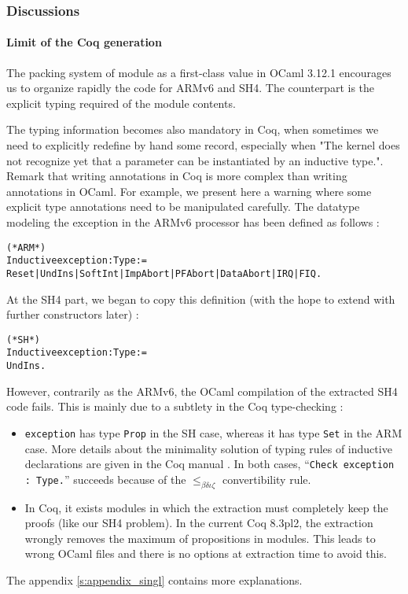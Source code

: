 \documentclass[a4paper, 11pt]{article}
\newenvironment{coq}
  {%
   \begin{alltt}
   \footnotesize} %% 8.3pl2 (April 2011)
  {\end{alltt} %
  }
\newcommand{\ocaml}{OCaml 3.12.1\xspace}
\newcommand{\coqc}{Coq 8.3pl2\xspace}
\newcommand{\coqkernel}{"The kernel does not recognize yet that a parameter can be instantiated by an inductive type."}
\begin{document}
\subsubsection{Discussions}

\paragraph{Limit of the Coq generation}
The packing system of module as a first-class value in \ocaml encourages us to organize rapidly the code for ARMv6 and SH4. The counterpart is the explicit typing required of the module contents. 

The typing information becomes also mandatory in Coq, when sometimes we need to explicitly redefine by hand some record, especially when \coqkernel. Remark that writing annotations in Coq is more complex than writing annotations in OCaml. For example, we present here a warning where some explicit type annotations need to be manipulated carefully. The datatype modeling the exception in the ARMv6 processor has been defined as follows :
\begin{coq}
(* ARM *)
Inductive exception : Type :=
  Reset | UndIns | SoftInt | ImpAbort | PFAbort | DataAbort | IRQ | FIQ.
\end{coq}
At the SH4 part, we began to copy this definition (with the hope to extend with further constructors later) :
\begin{coq}
(* SH *)
Inductive exception : Type :=
  UndIns.
\end{coq}
However, contrarily as the ARMv6, the OCaml compilation of the extracted SH4 code fails. This is mainly due to a subtlety in the Coq type-checking :
\begin{itemize}
\item \verb|exception| has type \verb|Prop| in the SH case, whereas it has type \verb|Set| in the ARM case. More details about the minimality solution of typing rules of inductive declarations are given in the Coq manual \cite{Coq:manual}. In both cases, ``\verb|Check exception : Type.|'' succeeds because of the $\leq_{\beta\delta\iota\zeta}$ convertibility rule.
\item In Coq, it exists modules in which the extraction must completely keep the proofs (like our SH4 problem). In the current \coqc, the extraction wrongly removes the maximum of propositions in modules. This leads to wrong OCaml files and there is no options at extraction time to avoid this.
\end{itemize}
The appendix \ref{s:appendix_singl} contains more explanations.
\end{document}

